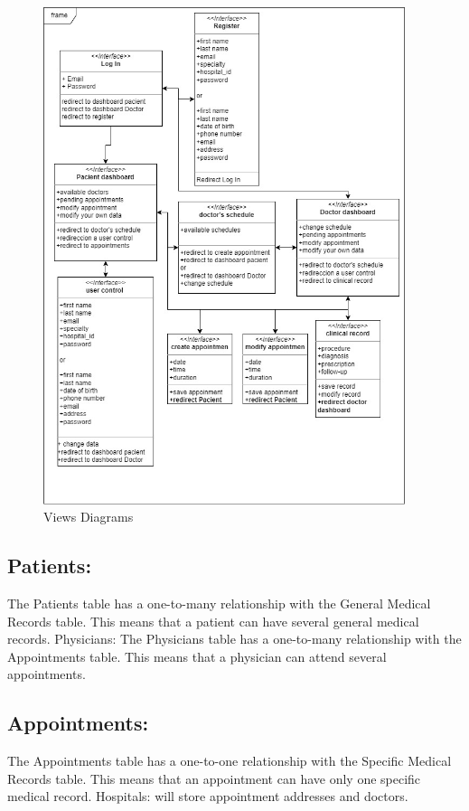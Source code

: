 \documentclass{scrreprt}
\begin{document}
	\pagebreak
		\begin{figure}[h]
		\centering
		\includegraphics[width=300pt]{vistas.jpg}
		\caption{Views Diagrams}
		\label{fig:Diagram}
	\end{figure}
	\subsection{Patients:}
	 The Patients table has a one-to-many relationship with the General Medical Records table. This means that a patient can have several general medical records.
	Physicians: The Physicians table has a one-to-many relationship with the Appointments table. This means that a physician can attend several appointments.
	
	\subsection{Appointments:}
	 The Appointments table has a one-to-one relationship with the Specific Medical Records table. This means that an appointment can have only one specific medical record.
	Hospitals: will store appointment addresses and doctors. 
	
	
\end{document}
